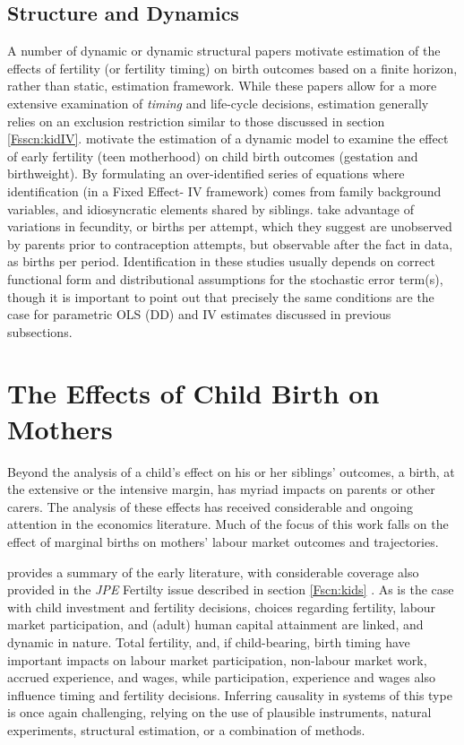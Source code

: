 \subsection{Structure and Dynamics}
A number of dynamic or dynamic structural papers motivate estimation of the
effects of fertility (or fertility timing) on birth outcomes based on a finite 
horizon, rather than static, estimation framework.  While these papers allow for 
a more extensive examination of \emph{timing} and life-cycle decisions, 
estimation generally relies on an exclusion restriction similar to those 
discussed in section \ref{Fsscn:kidIV}.  \citet{RosenzweigWolpin1995} motivate 
the estimation of a dynamic model to examine the effect of early fertility (teen 
motherhood) on child birth outcomes (gestation and birthweight).  By formulating 
an over-identified series of equations where identification (in a Fixed Effect-%
IV framework) comes from family background variables, and idiosyncratic elements 
shared by siblings. \citet{RosenzweigSchultz1985} take advantage of variations 
in fecundity, or births per attempt, which they suggest are unobserved by 
parents prior to contraception attempts, but observable after the fact in data, 
as births per period.  Identification in these studies usually depends on 
correct functional form and distributional assumptions for the stochastic error 
term(s), though it is important to point out that precisely the same conditions 
are the case for parametric OLS (DD) and IV estimates discussed in previous 
subsections.

\section{The Effects of Child Birth on Mothers}
\label{Fscn:mothers}
Beyond the analysis of a child's effect on his or her siblings' outcomes, a
birth, at the extensive or the intensive margin, has myriad impacts on parents
or other carers.  The analysis of these effects has received considerable and 
ongoing attention in the economics literature.  Much of the focus of this work
falls on the effect of marginal births on mothers' labour market outcomes and
trajectories.

\citet{FleisherRhodes1979} provides a summary of the early literature, with 
considerable coverage also provided in the \emph{JPE} Fertilty issue described
in section \ref{Fscn:kids} \citep{Willis1973,Gronau1973}.  As is the case with
child investment and fertility decisions, choices regarding fertility, labour
market participation, and (adult) human capital attainment are linked, and 
dynamic in nature.  Total fertility, and, if child-bearing, birth timing have
important impacts on labour market participation, non-labour market work, 
accrued experience, and wages, while participation, experience and wages also 
influence timing and fertility decisions. Inferring causality in systems of this 
type is once again challenging, relying on the use of plausible instruments, 
natural experiments, structural estimation, or a combination of methods.

